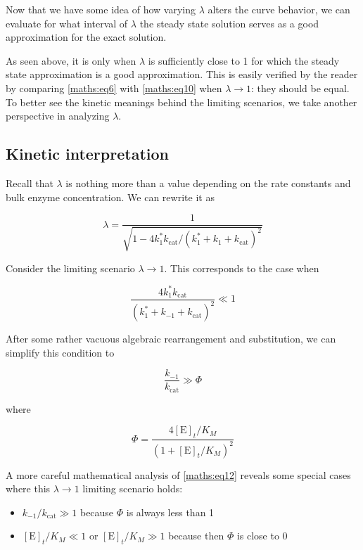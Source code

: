 \documentclass{article}
\newcommand{\Et}{[\text{E}]_t}
\newcommand{\kcat}{k_{\text{cat}}}
\begin{document}
\FloatBarrier

Now that we have some idea of how varying $\lambda$ alters the curve behavior, we can evaluate for what interval of $\lambda$ the steady state solution serves as a good approximation for the exact solution.

As seen above, it is only when $\lambda$ is sufficiently close to 1 for which the steady state approximation is a good approximation. This is easily verified by the reader by comparing \eqref{maths:eq6} with \eqref{maths:eq10} when $\lambda \to 1$: they should be equal. To better see the kinetic meanings behind the limiting scenarios, we take another perspective in analyzing $\lambda$.

\subsection{Kinetic interpretation} \label{subsection:6.2}

Recall that $\lambda$ is nothing more than a value depending on the rate constants and bulk enzyme concentration. We can rewrite it as

\[
\lambda = \frac{1}{\sqrt{1 - 4k_1^* \kcat / (k_1^* + k_1 + \kcat)^2}}
\]

Consider the limiting scenario $\lambda \to 1$. This corresponds to the case when

\[
\frac{4 k_1^* \kcat}{(k_1^* + k_{-1} + \kcat)^2} \ll 1
\]

After some rather vacuous algebraic rearrangement and substitution, we can simplify this condition to

\begin{equation} \label{maths:eq12}
\frac{k_{-1}}{\kcat} \gg \Phi
\end{equation}

where

\[
\Phi = \frac{4 \Et / K_M}{(1 + \Et / K_M)^2}
\]

A more careful mathematical analysis of \eqref{maths:eq12} reveals some special cases where this $\lambda \to 1$ limiting scenario holds:

\begin{itemize}
    \item $k_{-1} / \kcat \gg 1$ because $\Phi$ is always less than 1
    \item $\Et / K_M \ll 1$ or $\Et / K_M \gg 1$ because then $\Phi$ is close to 0
\end{itemize}
\end{document}
